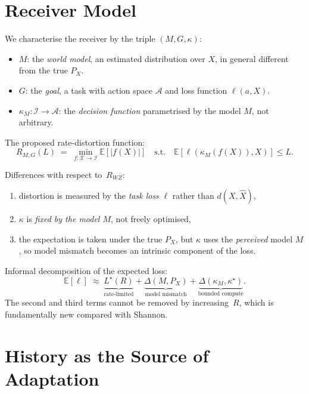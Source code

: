 \documentclass[11pt,a4paper]{article}
\begin{document}
\section{Receiver Model}

We characterise the receiver by the triple $(M, G, \kappa)$:
\begin{itemize}
    \item $M$: the \emph{world model}, an estimated distribution over
          $X$, in general different from the true $P_X$.
    \item $G$: the \emph{goal}, a task with action space $\mathcal{A}$
          and loss function $\ell(a, X)$.
    \item $\kappa_M : \mathcal{I} \to \mathcal{A}$:
          the \emph{decision function} parametrised by the model $M$,
          not arbitrary.
\end{itemize}

\noindent The proposed rate-distortion function:
\begin{equation}
    R_{M,G}(L) \;=\; \min_{f: \mathcal{X} \to \mathcal{I}}
    \mathbb{E}[|f(X)|]
    \quad \text{s.t.} \quad
    \mathbb{E}[\ell(\kappa_M(f(X)), X)] \le L.
    \label{eq:rmg}
\end{equation}

Differences with respect to~$R_{WZ}$:
\begin{enumerate}
    \item distortion is measured by the \emph{task loss} $\ell$ rather
          than $d(X,\hat{X})$,
    \item $\kappa$ is \emph{fixed by the model $M$}, not freely optimised,
    \item the expectation is taken under the true $P_X$, but $\kappa$
          uses the \emph{perceived} model $M$, so model mismatch
          becomes an intrinsic component of the loss.
\end{enumerate}

Informal decomposition of the expected loss:
\[
    \mathbb{E}[\ell] \;\approx\;
    \underbrace{L^\star(R)}_{\text{rate-limited}}
    + \underbrace{\Delta(M, P_X)}_{\text{model mismatch}}
    + \underbrace{\Delta(\kappa_M, \kappa^\star)}_{\text{bounded compute}}.
\]
The second and third terms cannot be removed by increasing~$R$, which
is fundamentally new compared with Shannon.

\section{History as the Source of Adaptation}
\end{document}

